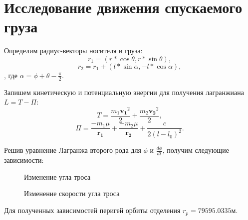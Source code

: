 \section{Исследование движения спускаемого груза}

Определим радиус-векторы носителя и груза:
\begin{equation*}
	r_1 = (r * \cos \theta, r * \sin \theta),
\end{equation*}
\begin{equation*}
	r_2 = r_1 + (l*\sin \alpha, - l * \cos \alpha),
\end{equation*},
где $\alpha=\phi + \theta - \frac{\pi}{2}$.

Запишем кинетическую и потенциальную энергии для получения лагранжиана $L = T - \Pi$:
\begin{equation*}
	T = \frac{m_1 \mathbf{v_1}^2}{2} + \frac{m_2 \mathbf{v_2}^2}{2},
\end{equation*}
\begin{equation*}
	\Pi = \frac{-m_1 \mu}{\mathbf{r_1}} + \frac{-m_2 \mu}{\mathbf{r_2}} + \frac{c}{2 (l-l_0)^2}.
\end{equation*}

Решив уравнение Лагранжа второго рода для $\phi$ и $\frac{d\phi}{dt}$, получим следующие зависимости:
\begin{figure}[H]
	\caption{Изменение угла троса}
\end{figure}
\begin{figure}[H]
	\caption{Изменение скорости угла троса}
\end{figure}

Для полученных зависимостей перигей орбиты отделения $r_p = 79 595.0335$м.